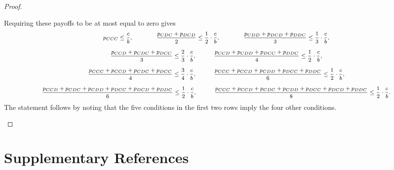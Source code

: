 \documentclass[9pt,twoside,lineno]{pnas-new}
\theoremstyle{plainCl1}
\theoremstyle{plainCl2}
\begin{document}
\begin{proof}
\begin{enumerate}
  \noindent
  Requiring these payoffs to be at most equal to zero gives
  \begin{equation*} \footnotesize
  \begin{array}{c}
  \displaystyle  p_{CCC} \leq \frac{c}{b}, 
    \qquad \qquad \frac{p_{CDC} + p_{DCD}}{2} \leq \frac{1}{2} \cdot \frac{c}{b}, 
    \qquad \qquad \frac{p_{CDD} + p_{DCD} + p_{DDC}}{3} \leq \frac{1}{3} \cdot \frac{c}{b},\\[0.45cm]
  \displaystyle  \frac{p_{CCD} + p_{CDC} + p_{DCC}}{3} \leq \frac{2}{3} \cdot \frac{c}{b},
    \quad \qquad \frac{p_{CCD} + p_{CDD} + p_{DCC} + p_{DDC}}{4} \leq \frac{1}{2}  \cdot \frac{c}{b}, \\[0.45cm]
    \displaystyle  \frac{p_{CCC} + p_{CCD} + p_{CDC} + p_{DCC}}{4} \leq \frac{3}{4} \cdot \frac{c}{b},
    \quad \qquad \frac{p_{CCC} + p_{CCD} + p_{CDD} + p_{DCC} + p_{DDC}}{6} \leq \frac{1}{2}  \cdot \frac{c}{b}, \\[0.45cm]
    \displaystyle  \frac{p_{CCD} + p_{CDC} + p_{CDD} + p_{DCC} + p_{DCD} + p_{DDC}}{6} \leq \frac{1}{2}  \cdot \frac{c}{b},
    \quad \qquad \frac{p_{CCC} + p_{CCD} + p_{CDC} +  p_{CDD} + p_{DCC} +  p_{DCD} + p_{DDC}}{8} \leq \frac{1}{2}  \cdot \frac{c}{b}.
    \end{array}
  \end{equation*}
  \noindent
  The statement follows by noting that the five conditions in the first two rows imply the four other conditions.
  \end{enumerate}
\end{proof}

\clearpage
\newpage

\section{Supplementary References}
\renewcommand\refname{ }
{\setlength{\bibsep}{0\baselineskip}
%

}
\end{document}
